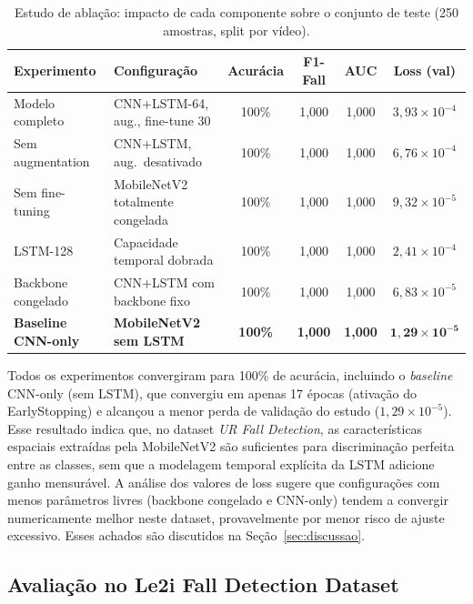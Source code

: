 \documentclass[12pt,a4paper]{article}
\begin{document}
\begin{table}[H]
\centering
\caption{Estudo de ablação: impacto de cada componente sobre o conjunto de teste (250 amostras, split por vídeo).}
\label{tab:ablation}
\begin{tabularx}{\textwidth}{lXcccc}
\toprule
\textbf{Experimento} & \textbf{Configuração} & \textbf{Acurácia} & \textbf{F1-Fall} & \textbf{AUC} & \textbf{Loss (val)} \\
\midrule
Modelo completo & CNN+LSTM-64, aug., fine-tune 30 & 100\% & 1,000 & 1,000 & $3{,}93 \times 10^{-4}$ \\
Sem augmentation & CNN+LSTM, aug.\ desativado & 100\% & 1,000 & 1,000 & $6{,}76 \times 10^{-4}$ \\
Sem fine-tuning & MobileNetV2 totalmente congelada & 100\% & 1,000 & 1,000 & $9{,}32 \times 10^{-5}$ \\
LSTM-128 & Capacidade temporal dobrada & 100\% & 1,000 & 1,000 & $2{,}41 \times 10^{-4}$ \\
Backbone congelado & CNN+LSTM com backbone fixo & 100\% & 1,000 & 1,000 & $6{,}83 \times 10^{-5}$ \\
\textbf{Baseline CNN-only} & \textbf{MobileNetV2 sem LSTM} & \textbf{100\%} & \textbf{1,000} & \textbf{1,000} & $\mathbf{1{,}29 \times 10^{-5}}$ \\
\bottomrule
\end{tabularx}
\end{table}

Todos os experimentos convergiram para 100\% de acurácia, incluindo o \textit{baseline} CNN-only (sem LSTM), que convergiu em apenas 17 épocas (ativação do EarlyStopping) e alcançou a menor perda de validação do estudo ($1{,}29 \times 10^{-5}$). Esse resultado indica que, no dataset \textit{UR Fall Detection}, as características espaciais extraídas pela MobileNetV2 são suficientes para discriminação perfeita entre as classes, sem que a modelagem temporal explícita da LSTM adicione ganho mensurável. A análise dos valores de loss sugere que configurações com menos parâmetros livres (backbone congelado e CNN-only) tendem a convergir numericamente melhor neste dataset, provavelmente por menor risco de ajuste excessivo. Esses achados são discutidos na Seção~\ref{sec:discussao}.

\subsection{Avaliação no Le2i Fall Detection Dataset}
\label{sec:le2i}
\end{document}
